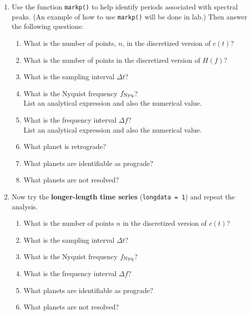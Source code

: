 \documentclass[11pt,titlepage,fleqn]{article}
\begin{document}
\begin{spacing}{2.0}
\begin{enumerate}

\item  Use the function \verb+markp()+ to help identify periods associated with spectral peaks. (An example of how to use \verb+markp()+ will be done in lab.) Then answer the following questions:
%
\begin{enumerate}
\item What is the number of points, $n$, in the discretized version of $c(t)$?
\item What is the number of points in the discretized version of $H(f)$?
\item What is the sampling interval $\Delta t$?
\item What is the Nyquist frequency $f_{\rm Nyq}$? \\
List an analytical expression and also the numerical value.
\item What is the frequency interval $\Delta f$? \\
List an analytical expression and also the numerical value.
\item What planet is retrograde?
\item What planets are identifiable as prograde?
\item What planets are not resolved?
\end{enumerate}

\item Now try the {\bf longer-length time series} (\verb+longdata = 1+) and repeat the analysis.
%
\begin{enumerate}
\item What is the number of points $n$ in the discretized version of $c(t)$?
\item What is the sampling interval $\Delta t$?
\item What is the Nyquist frequency $f_{\rm Nyq}$?
\item What is the frequency interval $\Delta f$?
\item What planets are identifiable as prograde?
\item What planets are not resolved?
\end{enumerate}

\end{enumerate}

\end{spacing}

%
%

\end{document}
